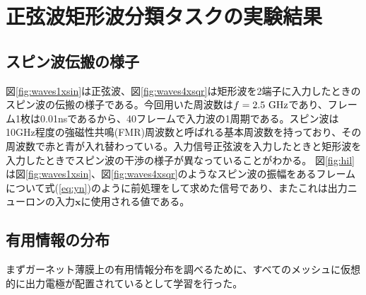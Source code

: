 \documentclass[a4j, twocolumn]{jsarticle}
\begin{document}
\section{正弦波矩形波分類タスクの実験結果}%
\label{sec:result}

\subsection{スピン波伝搬の様子}
\label{subsec:spinwave}

図\ref{fig:waves1xsin}は正弦波、図\ref{fig:waves4xsqr}は矩形波を2端子に入力したときのスピン波の伝搬の様子である。今回用いた周波数は$f=2.5~\rm{GHz}$であり、フレーム1枚は0.01nsであるから、40フレームで入力波の1周期である。スピン波は10GHz程度の強磁性共鳴(FMR)周波数と呼ばれる基本周波数を持っており、その周波数で赤と青が入れ替わっている。入力信号正弦波を入力したときと矩形波を入力したときでスピン波の干渉の様子が異なっていることがわかる。
図\ref{fig:hil}は図\ref{fig:waves1xsin}、図\ref{fig:waves4xsqr}のようなスピン波の振幅をあるフレームについて式(\ref{eq:yn})のように前処理をして求めた信号であり、またこれは出力ニューロンの入力$\bm{x}$に使用される値である。

\subsection{有用情報の分布}
\label{subsec:info}

まずガーネット薄膜上の有用情報分布を調べるために、すべてのメッシュに仮想的に出力電極が配置されているとして学習を行った。
\end{document}
